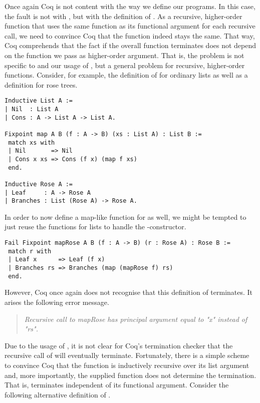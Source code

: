 \begin{excursus}

Once again Coq is not content with the way we define our programs.
In this case, the fault is not with , but with the
definition of .
As a recursive, higher-order function that uses the same function as its
functional argument for each recursive call, we need to convince Coq
that the function indeed stays the same.
That way, Coq comprehends that the fact if the overall function
terminates does not depend on the function we pass as higher-order
argument.
That is, the problem is not specific to  and our usage
of , but a general problem for recursive, higher-order
functions.
Consider, for example, the definition of  for ordinary
lists as well as a definition for rose trees.

\begin{verbatim}
Inductive List A :=
| Nil  : List A
| Cons : A -> List A -> List A.

Fixpoint map A B (f : A -> B) (xs : List A) : List B :=
 match xs with
 | Nil       => Nil
 | Cons x xs => Cons (f x) (map f xs)
 end.

Inductive Rose A :=
| Leaf     : A -> Rose A
| Branches : List (Rose A) -> Rose A.
\end{verbatim}

In order to now define a map-like function for  as well, we
might be tempted to just reuse the  functions for lists to
handle the -constructor.

\begin{verbatim}
Fail Fixpoint mapRose A B (f : A -> B) (r : Rose A) : Rose B :=
 match r with
 | Leaf x      => Leaf (f x)
 | Branches rs => Branches (map (mapRose f) rs)
 end.
\end{verbatim}

However, Coq once again does not recognise that this definition of
 terminates.
It arises the following error message.

\begin{quote}
\emph{Recursive call to mapRose has principal argument equal to "x" instead of "rs".}
 \end{quote}

Due to the usage of , it is not clear for Coq's termination
checker that the recursive call of  will eventually
terminate.
Fortunately, there is a simple scheme to convince Coq that the
function  is inductively recursive over its list argument
and, more importantly, the supplied function does not determine the
termination.
That is,  terminates independent of its functional argument.
Consider the following alternative definition of .


\end{excursus}
